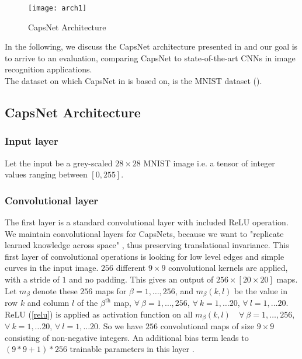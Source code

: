 \documentclass{article}
\begin{document}
{\begin{figure}[!htb]
\vskip 0.2in
\begin{center}
\centerline{\texttt{[image: arch1]}}
\caption{CapsNet Architecture \cite{arch1}\label{arch1}}
\end{center}
\vskip -0.2in
\end{figure}

In the following, we discuss the CapsNet architecture presented in \cite{he15} and our goal is to arrive to an evaluation, comparing CapsNet to state-of-the-art CNNs in image recognition applications.\\
The dataset on which CapsNet in \cite{hinton17} is based on, is the MNIST dataset (\cite{wiki_mnist}).

\subsection{CapsNet Architecture}
\subsubsection{Input layer}

Let the input be a grey-scaled $28 \times 28$ MNIST image i.e. a tensor of integer values ranging between $[0,255]$.

\subsubsection{Convolutional layer}
The first layer is a standard convolutional layer with included ReLU operation. We maintain convolutional layers for CapsNets, because we want to "replicate learned knowledge across space" \citep{hinton17}, thus preserving translational invariance. This first layer of convolutional operations is looking for low level edges and simple curves in the input image. $256$ different $9 \times 9$ convolutional kernels are applied, with a stride of $1$ and no padding. This gives an output of $256 \times [20 \times 20]$ maps.\\
Let $m_\beta$ denote these $256$ maps for $\beta=1, \ldots, 256$, and $m_\beta(k,l)$ be the value in row $k$ and column $l$ of the $\beta^{\text{th}}$ map, $\forall \ \beta=1, \ldots, 256$, $\forall \ k=1, \ldots 20$, $\forall \ l=1, \ldots 20$. ReLU (\ref{relu}) is applied as activation function on all $m_\beta(k,l) \quad \forall \ \beta=1, \ldots, 256$, $\forall \ k=1, \ldots 20$, $\forall \ l=1, \ldots 20$.  So we have $256$ convolutional maps of size $9 \times 9$ consisting of non-negative integers. An additional bias term leads to $(9*9+1)*256$ trainable parameters in this layer \cite{medium:capsnet}.

}
\end{document}
